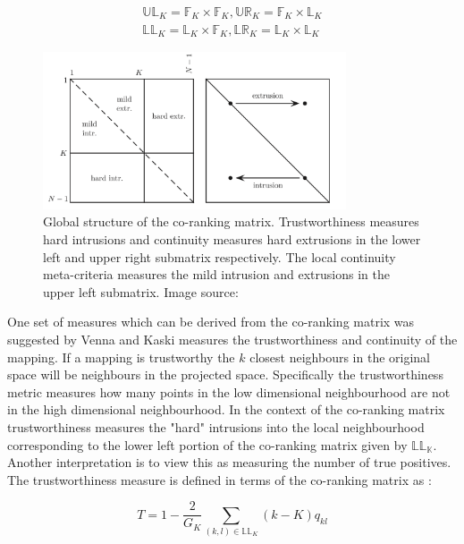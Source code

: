\begin{align}
	\mathbb{UL}_K = \mathbb{F}_K \times \mathbb{F}_K,  \mathbb{UR}_K = \mathbb{F}_K \times \mathbb{L}_K
	\\
	\mathbb{LL}_K = \mathbb{L}_K \times \mathbb{F}_K,  \mathbb{LR}_K = \mathbb{L}_K \times \mathbb{L}_K
\end{align}

\begin{figure}
	\label{fig:co-ranking-matrix}
	\centering
	\includegraphics[width=0.8\textwidth]{Images/co-ranking.png}	
	\caption{Global structure of the co-ranking matrix. Trustworthiness measures hard intrusions and continuity measures hard extrusions in the lower left and upper right submatrix respectively. The local continuity meta-criteria measures the mild intrusion and extrusions in the upper left submatrix. Image source: \cite{mokbel2013visualizing}}
\end{figure}


One set of measures which can be derived from the co-ranking matrix was suggested by Venna and Kaski \cite{kaski2003trustworthiness} measures the trustworthiness and continuity of the mapping. If a mapping is trustworthy the $k$ closest neighbours in the original space will be neighbours in the projected space. Specifically the trustworthiness metric measures how many points in the low dimensional neighbourhood are not in the high dimensional neighbourhood. In the context of the co-ranking matrix trustworthiness measures the "hard" intrusions into the local neighbourhood corresponding to the lower left portion of the co-ranking matrix given by $\mathbb{LL_K}$. Another interpretation is to view this as measuring the number of true positives. The trustworthiness measure is defined in terms of the co-ranking matrix as \cite{lee2009quality}:

\begin{equation}
	T = 1 - \frac{2}{G_{K}} \sum\limits_{(k,l) \in \mathbb{LL}_K} (k - K)q_{kl}
\end{equation} 

